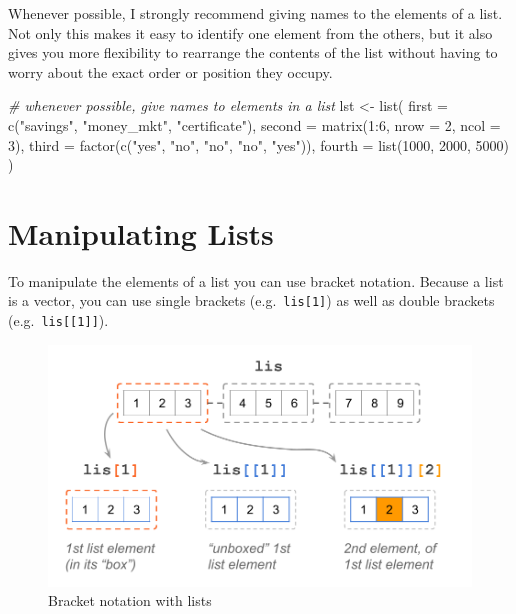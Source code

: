 \documentclass[
]{book}
\newenvironment{Shaded}{\begin{snugshade}}{\end{snugshade}}
\newcommand{\AttributeTok}[1]{\textcolor[rgb]{0.77,0.63,0.00}{#1}}
\newcommand{\CommentTok}[1]{\textcolor[rgb]{0.56,0.35,0.01}{\textit{#1}}}
\newcommand{\DecValTok}[1]{\textcolor[rgb]{0.00,0.00,0.81}{#1}}
\newcommand{\FunctionTok}[1]{\textcolor[rgb]{0.00,0.00,0.00}{#1}}
\newcommand{\NormalTok}[1]{#1}
\newcommand{\OtherTok}[1]{\textcolor[rgb]{0.56,0.35,0.01}{#1}}
\newcommand{\SpecialCharTok}[1]{\textcolor[rgb]{0.00,0.00,0.00}{#1}}
\newcommand{\StringTok}[1]{\textcolor[rgb]{0.31,0.60,0.02}{#1}}
\begin{document}
Whenever possible, I strongly recommend giving names to the elements of a list.
Not only this makes it easy to identify one element from the others, but it also
gives you more flexibility to rearrange the contents of the list without having
to worry about the exact order or position they occupy.

\begin{Shaded}
\begin{Highlighting}[]
\CommentTok{\# whenever possible, give names to elements in a list}
\NormalTok{lst }\OtherTok{\textless{}{-}} \FunctionTok{list}\NormalTok{(}
  \AttributeTok{first =} \FunctionTok{c}\NormalTok{(}\StringTok{"savings"}\NormalTok{, }\StringTok{"money\_mkt"}\NormalTok{, }\StringTok{"certificate"}\NormalTok{),}
  \AttributeTok{second =} \FunctionTok{matrix}\NormalTok{(}\DecValTok{1}\SpecialCharTok{:}\DecValTok{6}\NormalTok{, }\AttributeTok{nrow =} \DecValTok{2}\NormalTok{, }\AttributeTok{ncol =} \DecValTok{3}\NormalTok{),}
  \AttributeTok{third =} \FunctionTok{factor}\NormalTok{(}\FunctionTok{c}\NormalTok{(}\StringTok{"yes"}\NormalTok{, }\StringTok{"no"}\NormalTok{, }\StringTok{"no"}\NormalTok{, }\StringTok{"no"}\NormalTok{, }\StringTok{"yes"}\NormalTok{)),}
  \AttributeTok{fourth =} \FunctionTok{list}\NormalTok{(}\DecValTok{1000}\NormalTok{, }\DecValTok{2000}\NormalTok{, }\DecValTok{5000}\NormalTok{)}
\NormalTok{)}
\end{Highlighting}
\end{Shaded}

\hypertarget{manipulating-lists}{%
\section{Manipulating Lists}\label{manipulating-lists}}

To manipulate the elements of a list you can use bracket notation. Because a
list is a vector, you can use single brackets (e.g.~\texttt{lis{[}1{]}}) as well as
double brackets (e.g.~\texttt{lis{[}{[}1{]}{]}}).

\begin{figure}

{\centering \includegraphics[width=0.75\linewidth]{images/objects/obj-list-brackets1} 

}

\caption{Bracket notation with lists}\label{fig:unnamed-chunk-151}
\end{figure}
\end{document}
